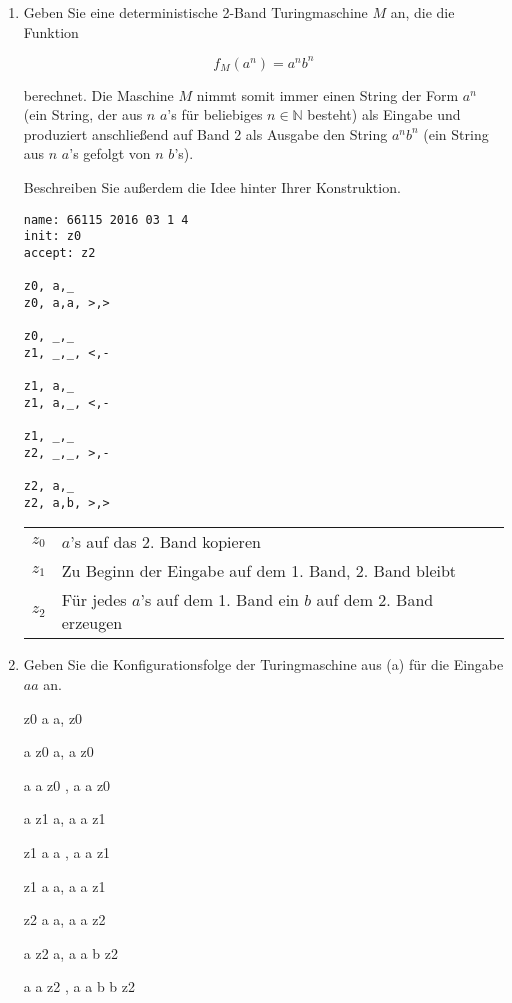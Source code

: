 \documentclass{bschlangaul-aufgabe}
\begin{document}

\let\l=\bTuringLeerzeichen

\begin{enumerate}


\item Geben Sie eine deterministische 2-Band Turingmaschine $M$ an, die
die Funktion

\begin{displaymath}
f_M(a^n) = a^n b^n
\end{displaymath}

berechnet. Die Maschine $M$ nimmt somit immer einen String der Form
$a^n$ (ein String, der aus $n$ $a$’s für beliebiges $n \in \mathbb{N}$
besteht) als Eingabe und produziert anschließend auf Band 2 als Ausgabe
den String $a^n b^n$ (ein String aus $n$ $a$’s gefolgt von $n$ $b$’s).

Beschreiben Sie außerdem die Idee hinter Ihrer Konstruktion.

\begin{bAntwort}
\begin{verbatim}
name: 66115 2016 03 1 4
init: z0
accept: z2

z0, a,_
z0, a,a, >,>

z0, _,_
z1, _,_, <,-

z1, a,_
z1, a,_, <,-

z1, _,_
z2, _,_, >,-

z2, a,_
z2, a,b, >,>
\end{verbatim}

\begin{tabular}{c|l}
$z_0$ & $a$’s auf das 2. Band kopieren \\
$z_1$ & Zu Beginn der Eingabe auf dem 1. Band, 2. Band bleibt\\
$z_2$ & Für jedes $a$’s auf dem 1. Band ein $b$ auf dem 2. Band erzeugen\\
\end{tabular}
\end{bAntwort}

\item Geben Sie die Konfigurationsfolge der Turingmaschine aus (a) für
die Eingabe $aa$ an.

\begin{bAntwort}
z0 a a,
z0 \l \l

a z0 a,
a z0 \l

a a z0 \l,
a a z0 \l

a z1 a,
a a z1 \l

z1 a a \l,
a a z1 \l

z1 \l a a,
a a z1 \l

z2 a a,
a a z2 \l

a z2 a,
a a b z2 \l

a a z2 \l,
a a b b z2 \l
\end{bAntwort}

\end{enumerate}
\end{document}
